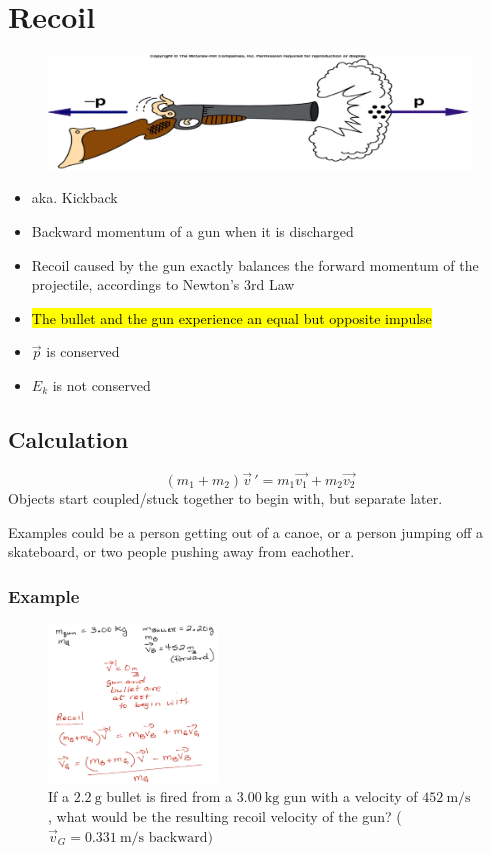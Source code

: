 \documentclass[a4paper,12pt]{article}
\begin{document}
\pagebreak

\section{Recoil}
\begin{figure}[H]
    \centering
    \includegraphics[width=\textwidth]{recoil}
\end{figure}
\begin{itemize}
    \item{aka. Kickback}
    \item{Backward momentum of a gun when it is discharged}
    \item{Recoil caused by the gun exactly balances the forward momentum of the projectile, accordings to Newton's 3rd Law}
    \item{\hl{The bullet and the gun experience an equal but opposite impulse}}
    \item{$\vec{p}$ is conserved}
    \item{$E_k$ is not conserved}
\end{itemize}

\subsection{Calculation}
\Large $$(m_1 + m_2)\vec{v}\,' = m_1\vec{v_1} + m_2\vec{v_2}$$ \normalsize
Objects start coupled/stuck together to begin with, but separate later.

Examples could be a person getting out of a canoe, or a person jumping off a skateboard, or two people pushing away from eachother.

\subsubsection{Example}
\begin{figure}[H]
    \centering
    \caption{If a $\SI{2.2}{\g}$ bullet is fired from a $\SI{3.00}{\kg}$ gun with a velocity of $\SI{452}{\m\per\s}$, what would be the resulting recoil velocity of the gun? ($\vec{v}_G = \SI{0.331}{\m\per\s}\textrm{ backward})$
}
    \includegraphics[width=0.4\textwidth]{q-recoil-1}
\end{figure}
\end{document}
